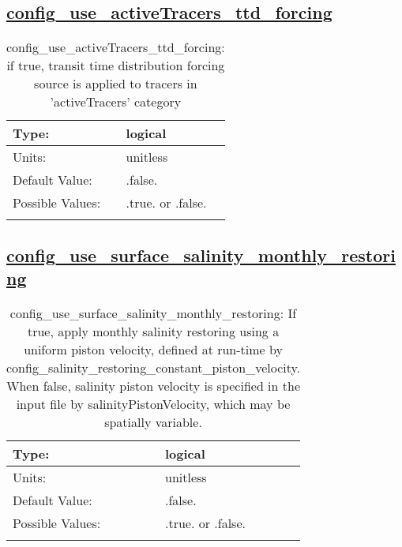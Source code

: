 \subsection[config\_use\_activeTracers\_ttd\_forcing]{\hyperref[sec:nm_tab_tracer_forcing_activeTracers]{config\_use\_activeTracers\_ttd\_forcing}}
\label{subsec:nm_sec_config_use_activeTracers_ttd_forcing}
\begin{center}
\begin{longtable}{| p{2.0in} || p{4.0in} |}
    \hline
    Type: & logical \\
    \hline
    Units: & \si{unitless} \\
    \hline
    Default Value: & .false. \\
    \hline
    Possible Values: & .true. or .false. \\
    \hline
    \caption{config\_use\_activeTracers\_ttd\_forcing: if true, transit time distribution forcing source is applied to tracers in 'activeTracers' category}
\end{longtable}
\end{center}
\subsection[config\_use\_surface\_salinity\_monthly\_restoring]{\hyperref[sec:nm_tab_tracer_forcing_activeTracers]{config\_use\_surface\_salinity\_monthly\_restoring}}
\label{subsec:nm_sec_config_use_surface_salinity_monthly_restoring}
\begin{center}
\begin{longtable}{| p{2.0in} || p{4.0in} |}
    \hline
    Type: & logical \\
    \hline
    Units: & \si{unitless} \\
    \hline
    Default Value: & .false. \\
    \hline
    Possible Values: & .true. or .false. \\
    \hline
    \caption{config\_use\_surface\_salinity\_monthly\_restoring: If true, apply monthly salinity restoring using a uniform piston velocity, defined at run-time by config\_salinity\_restoring\_constant\_piston\_velocity.  When false, salinity piston velocity is specified in the input file by salinityPistonVelocity, which may be spatially variable.}
\end{longtable}
\end{center}

